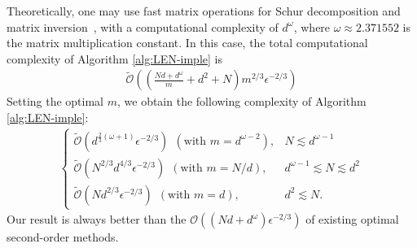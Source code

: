 \documentclass{article}
\def\gO{{\mathcal{O}}}
\theoremstyle{plain}
\begin{document}
Theoretically, one may use fast matrix operations for Schur decomposition and matrix inversion~\citep{demmel2007fast}, with a computational complexity of $d^{\omega}$, where $\omega \approx 2.371552$ is the matrix multiplication constant. In this case, the total computational complexity of Algorithm \ref{alg:LEN-imple} is
\begin{align*}
    \tilde \gO \left(\left(\frac{Nd + d^{\omega}}{m}  + d^2 + N \right) m^{2/3} \epsilon^{-2/3} \right)
\end{align*}
Setting the optimal $m$, we obtain the following complexity of Algorithm \ref{alg:LEN-imple}:
\begin{align*}
    \begin{cases}
        \tilde \gO(d^{\frac{2}{3}(\omega+1)} \epsilon^{-2/3}) ~~(\text{with } m= d^{\omega-2}) , &  N \lesssim d^{\omega-1} \\
        \tilde \gO(N^{2/3} d^{4/3} \epsilon^{-2/3}) ~~ (\text{with } m = N / d) , & d^{\omega-1} \lesssim N \lesssim d^2 \\
        \tilde \gO(N d^{2/3} \epsilon^{-2/3}) ~~ (\text{with } m=d), & d^2 \lesssim N.
    \end{cases}
\end{align*}
Our result is always better than the $\gO((N d+ d^{\omega}) \epsilon^{-2/3} )$ of existing optimal second-order methods.






























































































 
\end{document}
